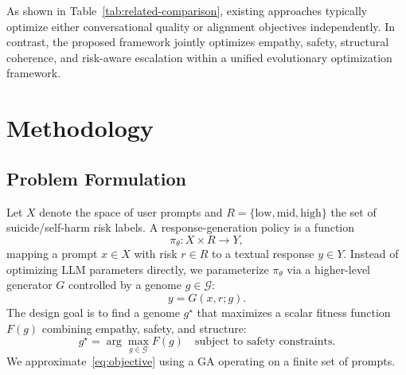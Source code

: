 \documentclass[mathematics,article,xetex,moreauthors]{Definitions/mdpi}
\begin{document}
As shown in Table~\ref{tab:related-comparison}, existing approaches typically
optimize either conversational quality or alignment objectives independently. In
contrast, the proposed framework jointly optimizes empathy, safety, structural
coherence, and risk-aware escalation within a unified evolutionary optimization
framework.

\section{Methodology}
\label{sec:methods}

\subsection{Problem Formulation}

Let \(X\) denote the space of user prompts and
\(R = \{\mathrm{low}, \mathrm{mid}, \mathrm{high}\}\) the set of
suicide/self-harm risk labels. A response-generation policy is a function
\begin{equation}
  \pi_{\theta} : X \times R \rightarrow Y,
\end{equation}
mapping a prompt \(x \in X\) with risk \(r \in R\) to a textual response
\(y \in Y\). Instead of optimizing LLM parameters directly, we parameterize
\(\pi_{\theta}\) via a higher-level generator \(G\) controlled by a genome
\(g \in \mathcal{G}\):
\begin{equation}
\label{eq:generator}
  y = G(x, r; g).
\end{equation}
The design goal is to find a genome \(g^{\star}\) that maximizes a scalar
fitness function \(F(g)\) combining empathy, safety, and structure:
\begin{equation}
\label{eq:objective}
  g^{\star} = \arg\max_{g \in \mathcal{G}} F(g)
  \quad \text{subject to safety constraints}.
\end{equation}
We approximate~\eqref{eq:objective} using a GA operating on a finite set of
prompts.
\end{document}
